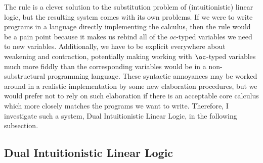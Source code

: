 The \citeauthor{BBdePH93}  rule is a clever solution to the
substitution problem of (intuitionistic) linear logic, but the resulting system
comes with its own problems.
If we were to write programs in a language directly implementing the
\citeauthor{BBdePH93} calculus, then the  rule would be a
pain point because it makes us rebind all of the $oc$-typed variables we need to
new variables.
Additionally, we have to be explicit everywhere about weakening and contraction,
potentially making working with $\oc$-typed variables much more fiddly than the
corresponding variables would be in a non-substructural programming language.
These syntactic annoyances may be worked around in a realistic implementation by
some new elaboration procedures, but we would prefer not to rely on such
elaboration if there is an acceptable core calculus which more closely matches
the programs we want to write.
Therefore, I investigate such a system, Dual Intuitionistic Linear Logic, in the
following subsection.

\subsection{Dual Intuitionistic Linear Logic}\label{sec:dill}


